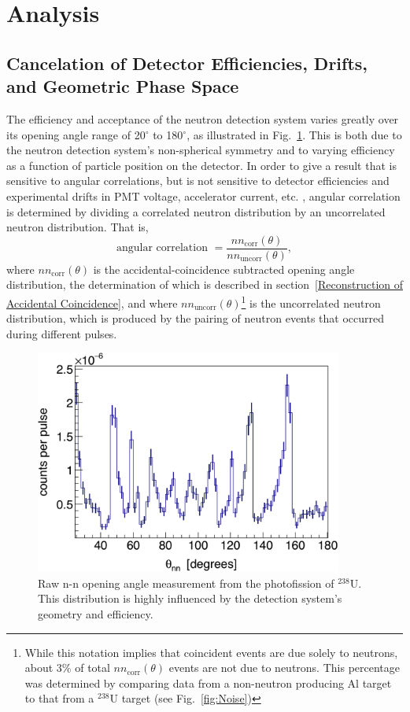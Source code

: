 \section{Analysis}
\label{Analysis}

\subsection{Cancelation of Detector Efficiencies, Drifts, and Geometric Phase Space}
\label{subsec:SPDPCancelation}
The efficiency and acceptance of the neutron detection system varies greatly over its opening angle range of 20$^{\circ}$ to 180$^{\circ}$, as illustrated in Fig.~\ref{fig:DetAcceptance}.
This is both due to the neutron detection system's non-spherical symmetry and to varying efficiency as a function of particle position on the detector.
In order to give a result that is sensitive to angular correlations, but is not sensitive to detector efficiencies and experimental drifts in PMT voltage, accelerator current, etc. , angular correlation is determined by dividing a correlated neutron distribution by an uncorrelated neutron distribution. That is,
\begin{equation}
\label{eq:angularCorr}
\text{angular correlation }  = \frac{nn_{\text{corr}}(\theta)}{nn_{\text{uncorr}}(\theta)},
\end{equation}
where $nn_{\text{corr}}(\theta)$ is the accidental-coincidence subtracted opening angle distribution, the determination of which is described in section~\ref{Reconstruction of Accidental Coincidence}, and where $nn_{\text{uncorr}}(\theta)$\footnote{While this notation implies that coincident events are due solely to neutrons, about 3\% of total  $nn_{\text{corr}}(\theta)$ events are not due to neutrons. This percentage was determined by comparing data from a non-neutron producing Al target to that from a $^{238}$U target (see Fig.~\ref{fig:Noise})} is the uncorrelated neutron distribution, which is produced by the pairing of neutron events that occurred during different pulses.
\begin{figure}[h]
\includegraphics[width=0.9\textwidth]{Content/Methods/DetAcceptance.png}
\caption{Raw n-n opening angle measurement from the photofission of $^{238}$U. 
This distribution is highly influenced by the detection system's geometry and efficiency.
}
\label{fig:DetAcceptance}
\end{figure}

